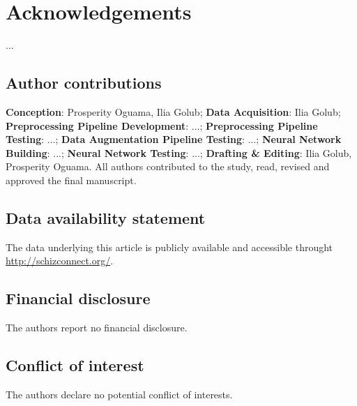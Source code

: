 \section*{Acknowledgements}

...

\subsection*{Author contributions}

\textbf{Conception}: Prosperity Oguama, Ilia Golub; \textbf{Data Acquisition}: Ilia Golub; \textbf{Preprocessing Pipeline Development}: ...; \textbf{Preprocessing Pipeline Testing}: ...; \textbf{Data Augmentation Pipeline Testing}: ...; \textbf{Neural Network Building}: ...; \textbf{Neural Network Testing}: ...; \textbf{Drafting \& Editing}: Ilia Golub, Prosperity Oguama. All authors contributed to the study, read, revised and approved the final manuscript.

\subsection*{Data availability statement}
The data underlying this article is publicly available and accessible throught \hyperlink{Schizconnect}{http://schizconnect.org/}.

\subsection*{Financial disclosure}

The authors report no financial disclosure.

\subsection*{Conflict of interest}

The authors declare no potential conflict of interests.

